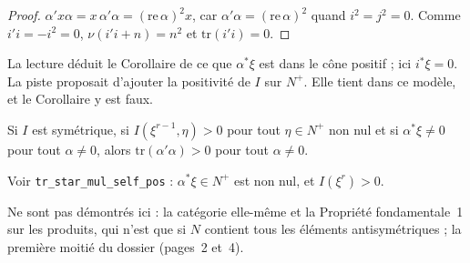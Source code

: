 \begin{proof}
$\alpha'x\alpha = x\,\alpha'\alpha = (\mathrm{re}\,\alpha)^2x$, car $\alpha'\alpha = (\mathrm{re}\,\alpha)^2$ quand $i^2 = j^2 = 0$. Comme $i'i = -i^2 = 0$, $\nu(i'i + n) = n^2$ et $\mathrm{tr}(i'i) = 0$.
\end{proof}

\noindent La lecture déduit le Corollaire de ce que $\alpha^*\xi$ est dans le cône positif ; ici $i^*\xi = 0$. La piste proposait d'ajouter la positivité de $I$ sur $N^+$. Elle tient dans ce modèle, et le Corollaire y est faux.

\begin{enonce}
Si $I$ est symétrique, si $I(\xi^{r-1}, \eta) > 0$ pour tout $\eta \in N^+$ non nul et si $\alpha^*\xi \neq 0$ pour tout $\alpha \neq 0$, alors $\mathrm{tr}(\alpha'\alpha) > 0$ pour tout $\alpha \neq 0$.
\end{enonce}

\begingroup\raggedright
\noindent Voir \texttt{tr\_star\_mul\_self\_pos} : $\alpha^*\xi \in N^+$ est non nul, et $I(\xi^r) > 0$.\par\endgroup

Ne sont pas démontrés ici : la catégorie elle-même et la Propriété fondamentale~1 sur les produits, qui n'est  que si $N$ contient tous les éléments antisymétriques ; la première moitié du dossier (pages~2 et~4).
